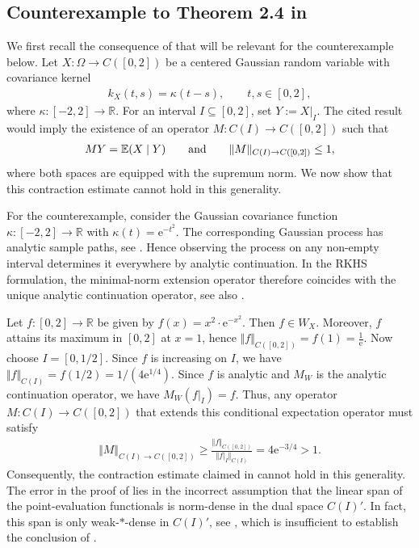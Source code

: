 \documentclass{article}
\newcommand{\R}{\mathbb{R}}
\newcommand{\e}{\mathrm{e}}
\begin{document}
\subsection{Counterexample to Theorem 2.4 in \texorpdfstring{\cite{lagatta2013continuous}}{Lagatta et al. (2013)}}
We first recall the consequence of \cite[Theorem 2.4 and Corollary 2.5]{lagatta2013continuous} that will be relevant for the counterexample below. Let $X:\Omega\to C([0,2])$ be a centered Gaussian random variable with covariance kernel
\begin{align*}
k_X(t,s)=\kappa(t-s),
\qquad t,s\in[0,2],
\end{align*}
where $\kappa:[-2,2]\to\mathbb R$. For an interval $I\subseteq[0,2]$, set $Y:=X|_I$. The cited result would imply the existence of an operator
$M:C(I)\to C([0,2])$
such that
\begin{align*}
MY=\mathbb E(X\mid Y) \qquad \textup{and} \qquad \Vert M\Vert_{C(I)\to C([0,2])}\leq 1,
\end{align*}
where both spaces are equipped with the supremum norm. We now show that this contraction estimate cannot hold in this generality.

For the counterexample, consider the Gaussian covariance function $\kappa:[-2,2] \to \R$ with $\kappa(t)=\e^{-t^2}$. The corresponding Gaussian process has analytic sample paths, see \cite{belyaev1959analytic}. Hence observing the process on any non-empty interval determines it everywhere by analytic continuation. In the RKHS formulation, the minimal-norm extension operator therefore coincides with the unique analytic continuation operator, see also \cite{lichtenberger1974note}.

Let $f:[0,2] \to \R$ be given by $f(x)=x^2 \cdot \e^{-x^2}$. Then $f \in W_X$. Moreover, $f$ attains its maximum in $[0,2]$ at $x=1$, hence $\Vert f\Vert_{C([0,2])}=f(1)=\frac{1}{\mathrm e}$. Now choose $I=[0,1/2]$. Since $f$ is increasing on $I$, we have $\Vert f \Vert_{C(I)} = f(1/2) =1/(4\e^{1/4})$. Since $f$ is analytic and $M_W$ is the analytic continuation operator, we have $M_W (f|_I)=f$. 
Thus, any operator $M:C(I)\to C([0,2])$ that extends this conditional expectation operator must satisfy 
\begin{align*}
\Vert M \Vert_{C(I) \to C([0,2])} \geq \frac{\Vert f\Vert_{C([0,2])}}{\Vert f|_I\Vert_{C(I)}} = 4 \mathrm{e}^{-3/4} >1.
\end{align*}
Consequently, the contraction estimate claimed in \cite[Theorem~2.4 and Corollary~2.5]{lagatta2013continuous} cannot hold in this generality. The error in the proof of \cite[Theorem~2.4]{lagatta2013continuous} lies in the incorrect assumption that the linear span of the point-evaluation functionals is norm-dense in the dual space $C(I)'$. In fact, this span is only weak-$*$-dense in $C(I)'$, see \cite[Page 114]{ReedSimonI}, which is insufficient to establish the conclusion of \cite[Theorem~2.4]{lagatta2013continuous}.
\end{document}
